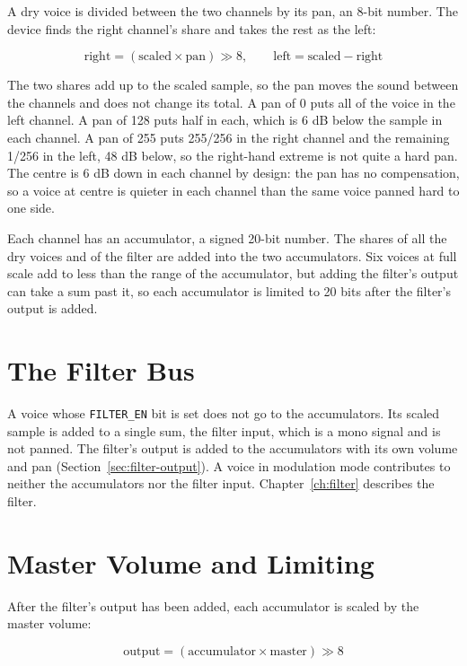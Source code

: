 A dry voice is divided between the two channels by its pan, an 8-bit number. The device finds the right channel's share
and takes the rest as the left:

\begin{equation*}
	\mathrm{right} = (\mathrm{scaled} \times \mathrm{pan}) \gg 8, \qquad \mathrm{left} = \mathrm{scaled} - \mathrm{right}
\end{equation*}

The two shares add up to the scaled sample, so the pan moves the sound between the channels and does not change its
total. A pan of 0 puts all of the voice in the left channel. A pan of 128 puts half in each, which is 6 dB below the
sample in each channel. A pan of 255 puts 255/256 in the right channel and the remaining 1/256 in the left, 48 dB
below, so the right-hand extreme is not quite a hard pan. The centre is 6 dB down in each channel by design: the pan
has no compensation, so a voice at centre is quieter in each channel than the same voice panned hard to one side.

Each channel has an accumulator, a signed 20-bit number. The shares of all the dry voices and of the filter are added
into the two accumulators. Six voices at full scale add to less than the range of the accumulator, but adding the
filter's output can take a sum past it, so each accumulator is limited to 20 bits after the filter's output is added.

\section{The Filter Bus}

A voice whose \texttt{FILTER\_EN} bit is set does not go to the accumulators. Its scaled sample is added to a single
sum, the filter input, which is a mono signal and is not panned. The filter's output is added to the accumulators with
its own volume and pan (Section~\ref{sec:filter-output}). A voice in modulation mode contributes to neither the
accumulators nor the filter input. Chapter~\ref{ch:filter} describes the filter.

\section{Master Volume and Limiting}
\label{sec:master-volume}

After the filter's output has been added, each accumulator is scaled by the master volume:

\begin{equation*}
	\mathrm{output} = (\mathrm{accumulator} \times \mathrm{master}) \gg 8
\end{equation*}

